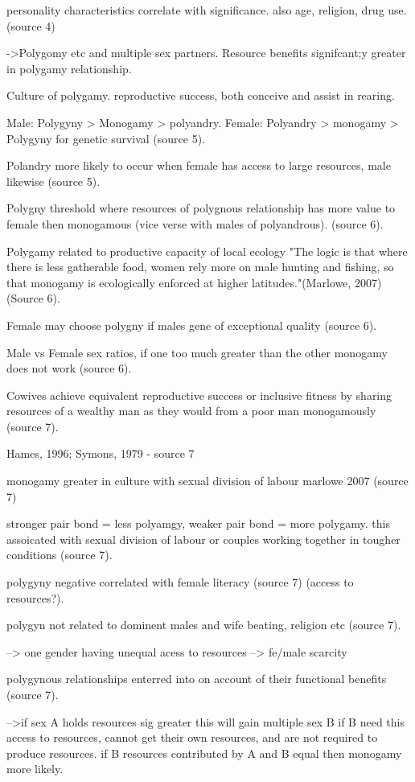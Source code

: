 personality characteristics correlate with significance. also age, religion, drug use. (source 4) 


->Polygomy etc and multiple sex partners.
Resource benefits signifcant;y greater in polygamy relationship.

Culture of polygamy.
reproductive success, both conceive and assist in rearing.

Male: Polygyny > Monogamy > polyandry. Female: Polyandry > monogamy > Polygyny for genetic survival (source 5).

Polandry more likely to occur when female has access to large resources, male likewise (source 5).

Polygny threshold where resources of polygnous relationship has more value to female then monogamous (vice verse with males of polyandrous). (source 6).

Polygamy related to productive capacity of local ecology "The logic is that where there is less gatherable food, women rely more on male hunting and fishing, so that monogamy is ecologically enforced at higher latitudes."(Marlowe, 2007)(Source 6).

Female may choose polygny if males gene of exceptional quality (source 6).

Male vs Female sex ratios, if one too much greater than the other monogamy does not work (source 6).

Cowives achieve equivalent reproductive success or inclusive fitness by sharing resources of a wealthy man as they would from a poor man monogamously (source 7).

Hames, 1996; Symons, 1979 - source 7

monogamy greater in culture with sexual division of labour marlowe 2007 (source 7)

stronger pair bond = less polyamgy, weaker pair bond = more polygamy. this assoicated with sexual division of labour or couples working together in tougher conditions (source 7).

polygyny negative correlated with female literacy (source 7) (access to resources?).

polygyn not related to dominent males and wife beating, religion etc (source 7).

--> one gender having unequal acess to resources
--> fe/male scarcity

polygynous relationships enterred into on account of their functional benefits (source 7).

-->if sex A holds resources sig greater this will gain multiple sex B if B need this access to resources, cannot get their own resources, and are not required to produce resources. if B resources contributed by A and B equal then monogamy more likely.


